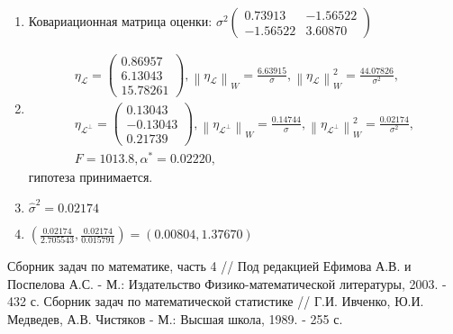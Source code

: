 \documentclass[a4paper,12pt]{article}
\newcommand{\norm}[1]{\left \| #1 \right \|}
\newcommand{\pr}[2]{#1_\mathcal{#2}}
\newcommand{\pro}[2]{#1_{\mathcal{#2}^\perp}}
\begin{document}
\begin{enumerate}
\begin{enumerate}
                  \item Ковариационная матрица оценки:
                        $
                              \sigma^2
                              \begin{pmatrix}
                                    0.73913  & -1.56522 \\
                                    -1.56522 & 3.60870
                              \end{pmatrix}
                        $

                  \item
                        \begin{gather*}
                              \pr{\eta}{L} =
                              \begin{pmatrix}
                                    0.86957 \\
                                    6.13043 \\
                                    15.78261
                              \end{pmatrix},
                              \norm{\pr{\eta}{L}}_W = \frac{6.63915}{\sigma} ,
                              \norm{\pr{\eta}{L}}_W^2 = \frac{44.07826}{\sigma^2} , \\
                              \pro{\eta}{L} =
                              \begin{pmatrix}
                                    0.13043  \\
                                    -0.13043 \\
                                    0.21739
                              \end{pmatrix} ,
                              \norm{\pro{\eta}{L}}_W = \frac{0.14744}{\sigma} ,
                              \norm{\pro{\eta}{L}}_W^2 = \frac{0.02174}{\sigma^2} , \\
                              F = 1013.8, \alpha^* = 0.02220,
                        \end{gather*}
                        гипотеза принимается.
                  \item $\widehat{\sigma}^2 = 0.02174$
                  \item $\left( \frac{0.02174}{2.705543}, \frac{0.02174}{0.015791} \right) = \left( 0.00804, 1.37670 \right)$
            \end{enumerate}
\end{enumerate}

\begin{thebibliography}{2}
       Сборник задач по математике, часть 4 // Под редакцией Ефимова А.В. и Поспелова А.С. - М.: Издательство Физико-математической
      литературы, 2003. - 432 с.
       Сборник задач по математической статистике // Г.И. Ивченко, Ю.И. Медведев, А.В. Чистяков - М.: Высшая школа, 1989. - 255 с.
\end{thebibliography}
\end{document}
